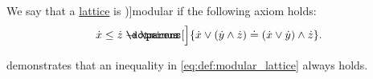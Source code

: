 \begin{definition}\label{def:modular_lattice}
  We say that a \hyperref[def:lattice]{lattice} is \term[ru=модулярная (решётка) (\cite[def. 4.6]{Гуров2013Решётки})]{modular} if the following axiom holds:
  \begin{equation}\label{eq:def:modular_lattice}
    \synx \leq \synz \synimplies \parens[\Big]{ \synx \vee (\syny \wedge \synz) \syneq (\synx \vee \syny) \wedge \synz }.
  \end{equation}
\end{definition}
\begin{comments}
  \item {} demonstrates that an inequality in \eqref{eq:def:modular_lattice} always holds.
\end{comments}

